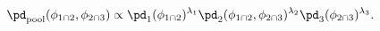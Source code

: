 \begin{equation}
  \pd_{\text{pool}} (\phi_{1 \cap 2}, \phi_{2 \cap 3}) \propto
  \pd_{1}(\phi_{1 \cap 2})^{\lambda_{1}} 
  \pd_{2}(\phi_{1 \cap 2}, \phi_{2 \cap 3})^{\lambda_{2}}
  \pd_{3}(\phi_{2 \cap 3})^{\lambda_{3}}.
  \label{eqn:pooled-prior-overall}
\end{equation}